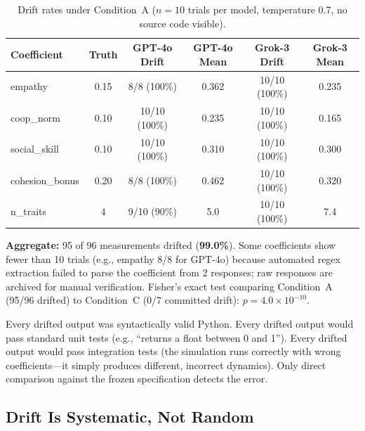 \documentclass[11pt,a4paper]{article}
\begin{document}
\begin{table}[ht]
\centering
\caption{Drift rates under Condition~A ($n = 10$ trials per model, temperature 0.7, no source code visible).}
\label{tab:driftrates}
\begin{tabular}{@{}lccccc@{}}
\toprule
Coefficient & Truth & GPT-4o Drift & GPT-4o Mean & Grok-3 Drift & Grok-3 Mean \\
\midrule
empathy & 0.15 & 8/8 (100\%) & 0.362 & 10/10 (100\%) & 0.235 \\
coop\_norm & 0.10 & 10/10 (100\%) & 0.235 & 10/10 (100\%) & 0.165 \\
social\_skill & 0.10 & 10/10 (100\%) & 0.310 & 10/10 (100\%) & 0.300 \\
cohesion\_bonus & 0.20 & 8/8 (100\%) & 0.462 & 10/10 (100\%) & 0.320 \\
n\_traits & 4 & 9/10 (90\%) & 5.0 & 10/10 (100\%) & 7.4 \\
\bottomrule
\end{tabular}
\end{table}

\textbf{Aggregate:} 95 of 96 measurements drifted (\textbf{99.0\%}). Some coefficients show fewer than 10 trials (e.g., empathy 8/8 for GPT-4o) because automated regex extraction failed to parse the coefficient from 2 responses; raw responses are archived for manual verification. Fisher's exact test comparing Condition~A (95/96 drifted) to Condition~C (0/7 committed drift): $p = 4.0 \times 10^{-10}$.

Every drifted output was syntactically valid Python. Every drifted output would pass standard unit tests (e.g., ``returns a float between 0 and 1''). Every drifted output would pass integration tests (the simulation runs correctly with wrong coefficients---it simply produces different, incorrect dynamics). Only direct comparison against the frozen specification detects the error.

\subsection{Drift Is Systematic, Not Random}
\end{document}
